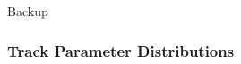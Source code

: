 \documentclass[18pt]{beamer}
\begin{document}
\backupbegin

\begin{frame}
  \centering \huge
  Backup
\end{frame}

\begin{frame}
  \frametitle{Track Parameter Distributions}
  
\end{frame}
\end{document}
